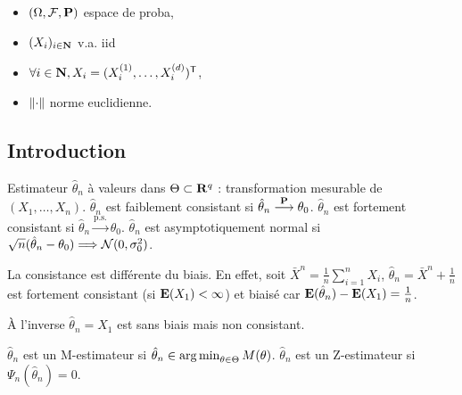 \begin{note}
	\begin{itemize}
		\item[\textbullet] $(\Omega,\mathcal{F},\mathbf{P})$ espace de proba,
		\item[\textbullet] $(X_i)_{i \in \mathbf{N}}$ v.a. iid
		\item[\textbullet] $\forall i \in \mathbf{N}, X_i =  (X_i^{(1)},\ldots,X_i^{(d)}) ^\mathsf{T}$,
		\item[\textbullet] $\left\lVert\cdot\right\rVert$ norme euclidienne.
	\end{itemize}
\end{note}

\subsection{Introduction}

	\begin{defn}
		Estimateur $\hat{\theta}_n$ à valeurs dans $\Theta \subset \mathbf{R}^q$ : transformation mesurable de $(X_1,\ldots,X_n)$.
		$\hat{\theta}_n$ est faiblement consistant si $\hat{\theta}_n \overset{\mathbf{P}}{\longrightarrow} \theta_0$.
		$\hat{\theta}_n$ est fortement consistant si $\hat{\theta}_n \overset{\text{p.s.}}{\longrightarrow} \theta_0$.
		$\hat{\theta}_n$ est asymptotiquement normal si $\sqrt{n}(\hat{\theta}_n - \theta_0) \Longrightarrow \mathcal{N}(0,\sigma_0^2)$.
	\end{defn}

	\begin{rem}
		La consistance est différente du biais.
		En effet, soit $\bar{X}^n = \frac{1}{n} \sum_{i = 1}^n X_i$, $\hat{\theta}_n = \bar{X}^n + \frac{1}{n}$ est fortement consistant (si $\mathbf{E}(X_1) < \infty$) et biaisé car $\mathbf{E}(\hat{\theta}_n) - \mathbf{E}(X_1) = \frac{1}{n}$.
		
		À l'inverse $\hat{\theta}_n = X_1$ est sans biais mais non consistant.
	\end{rem}
	
	\begin{defn}
		$\hat{\theta}_n$ est un M-estimateur si $\hat{\theta}_n \in \operatorname{arg\, min}_{\theta \in \Theta} M(\theta)$.
		$\hat{\theta}_n$ est un Z-estimateur si $\Psi_n(\hat{\theta}_n) = 0$.
	\end{defn}
	
